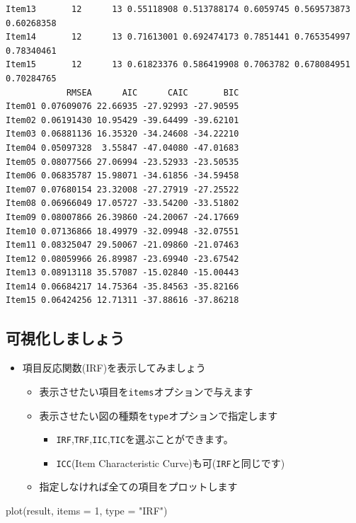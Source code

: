 \documentclass[
  a4paper,
]{ltjsbook}
\newenvironment{Shaded}{\begin{snugshade}}{\end{snugshade}}
\newcommand{\AttributeTok}[1]{\textcolor[rgb]{0.40,0.45,0.13}{#1}}
\newcommand{\DecValTok}[1]{\textcolor[rgb]{0.68,0.00,0.00}{#1}}
\newcommand{\FunctionTok}[1]{\textcolor[rgb]{0.28,0.35,0.67}{#1}}
\newcommand{\NormalTok}[1]{\textcolor[rgb]{0.00,0.23,0.31}{#1}}
\newcommand{\StringTok}[1]{\textcolor[rgb]{0.13,0.47,0.30}{#1}}
\providecommand{\tightlist}{%
  \setlength{\itemsep}{0pt}\setlength{\parskip}{0pt}}\usepackage{longtable,booktabs,array}
\begin{document}
\begin{verbatim}
Item13       12      13 0.55118908 0.513788174 0.6059745 0.569573873 0.60268358
Item14       12      13 0.71613001 0.692474173 0.7851441 0.765354997 0.78340461
Item15       12      13 0.61823376 0.586419908 0.7063782 0.678084951 0.70284765
            RMSEA      AIC      CAIC       BIC
Item01 0.07609076 22.66935 -27.92993 -27.90595
Item02 0.06191430 10.95429 -39.64499 -39.62101
Item03 0.06881136 16.35320 -34.24608 -34.22210
Item04 0.05097328  3.55847 -47.04080 -47.01683
Item05 0.08077566 27.06994 -23.52933 -23.50535
Item06 0.06835787 15.98071 -34.61856 -34.59458
Item07 0.07680154 23.32008 -27.27919 -27.25522
Item08 0.06966049 17.05727 -33.54200 -33.51802
Item09 0.08007866 26.39860 -24.20067 -24.17669
Item10 0.07136866 18.49979 -32.09948 -32.07551
Item11 0.08325047 29.50067 -21.09860 -21.07463
Item12 0.08059966 26.89987 -23.69940 -23.67542
Item13 0.08913118 35.57087 -15.02840 -15.00443
Item14 0.06684217 14.75364 -35.84563 -35.82166
Item15 0.06424256 12.71311 -37.88616 -37.86218
\end{verbatim}

\subsection{可視化しましょう}\label{ux53efux8996ux5316ux3057ux307eux3057ux3087ux3046}

\begin{itemize}
\tightlist
\item
  項目反応関数(IRF)を表示してみましょう

  \begin{itemize}
  \tightlist
  \item
    表示させたい項目を\texttt{items}オプションで与えます
  \item
    表示させたい図の種類を\texttt{type}オプションで指定します

    \begin{itemize}
    \tightlist
    \item
      \texttt{IRF},\texttt{TRF},\texttt{IIC},\texttt{TIC}を選ぶことができます。
    \item
      \texttt{ICC}(Item Characteristic
      Curve)も可(\texttt{IRF}と同じです)
    \end{itemize}
  \item
    指定しなければ全ての項目をプロットします
  \end{itemize}
\end{itemize}

\begin{Shaded}
\begin{Highlighting}[]
\FunctionTok{plot}\NormalTok{(result, }\AttributeTok{items =} \DecValTok{1}\NormalTok{, }\AttributeTok{type =} \StringTok{"IRF"}\NormalTok{)}
\end{Highlighting}
\end{Shaded}
\end{document}
